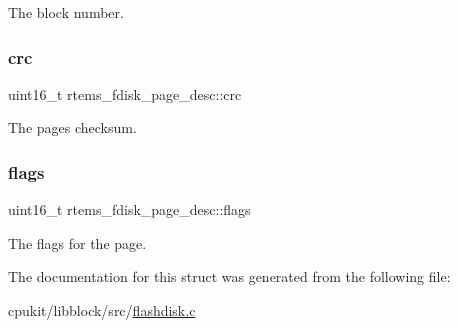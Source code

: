 The block number. \mbox{\label{structrtems__fdisk__page__desc_ab536a8971dc1689be4f48d2a4b501211}} 
\subsubsection{\texorpdfstring{crc}{crc}}
{\footnotesize\ttfamily uint16\+\_\+t rtems\+\_\+fdisk\+\_\+page\+\_\+desc\+::crc}

The page\textquotesingle{}s checksum. \mbox{\label{structrtems__fdisk__page__desc_a9e97ebc43a3bd8d3b5c6e091a2954ec5}} 
\subsubsection{\texorpdfstring{flags}{flags}}
{\footnotesize\ttfamily uint16\+\_\+t rtems\+\_\+fdisk\+\_\+page\+\_\+desc\+::flags}

The flags for the page. 

The documentation for this struct was generated from the following file\+:\begin{DoxyCompactItemize}
\item 
cpukit/libblock/src/\mbox{\hyperlink{flashdisk_8c}{flashdisk.\+c}}\end{DoxyCompactItemize}
